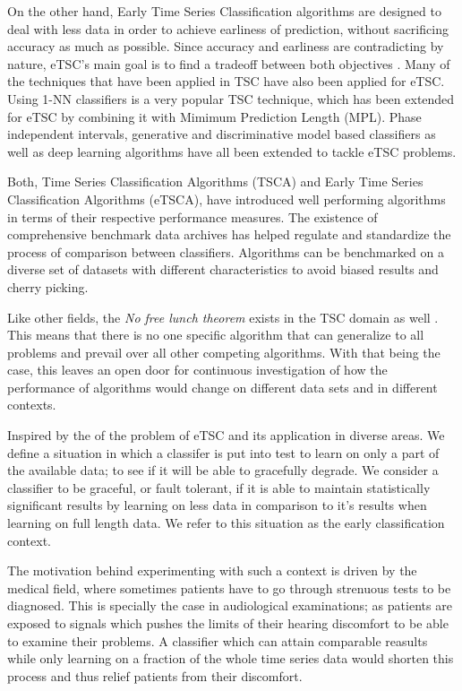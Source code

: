 On the other hand, Early Time Series Classification algorithms are designed to deal with less data in order to achieve earliness of prediction, without sacrificing accuracy as much as possible.
Since accuracy and earliness are contradicting by nature, eTSC's main goal is to find a tradeoff between both objectives \cite{gupta2020fault}.
Many of the techniques that have been applied in TSC have also been applied for eTSC.
Using 1-NN classifiers is a very popular TSC technique, which has been extended for eTSC by combining it with Mimimum Prediction Length (MPL)\cite{xing2012early}.
Phase independent intervals\cite{ghalwash2012early,he2015early}, generative and discriminative model based classifiers\cite{li2014early,cheng2018predicting} as well as deep learning algorithms \cite{huang2018multivariate, russwurm2019end}
have all been extended to tackle eTSC problems.


Both, Time Series Classification Algorithms (TSCA) and Early Time Series Classification Algorithms (eTSCA), have introduced well performing algorithms in terms of their respective performance measures.
The existence of comprehensive benchmark data archives \cite{UCRArchive2018,bagnall2018uea} has helped regulate and standardize the process of comparison between classifiers.
Algorithms can be benchmarked on a diverse set of datasets with different characteristics to avoid biased results and cherry picking.

Like other fields, the \emph{No free lunch theorem} exists in the TSC domain as well \cite{bagnall2017great,bostrom2018shapelet}.
This means that there is no one specific algorithm that can generalize to all problems and prevail over all other competing algorithms.
With that being the case, this leaves an open door for continuous investigation of how the performance of algorithms would change on different data sets and in different contexts.

Inspired by the of the problem of eTSC and its application in diverse areas.
We define a situation in which a classifer is put into test to learn on only a part of the available data; to see if it will be able to gracefully degrade.
We consider a classifier to be graceful, or fault tolerant, if it is able to maintain statistically significant results by learning on less data in comparison to it's results when learning on full length data.
We refer to this situation as the early classification context.

The motivation behind experimenting with such a context is driven by the medical field, where sometimes patients have to go through strenuous tests to be diagnosed.
This is specially the case in audiological examinations; as patients are exposed to signals which pushes the limits of their hearing discomfort to be able to examine their problems.
A classifier which can attain comparable reasults while only learning on a fraction of the whole time series data would shorten this process and thus relief patients from their discomfort.

